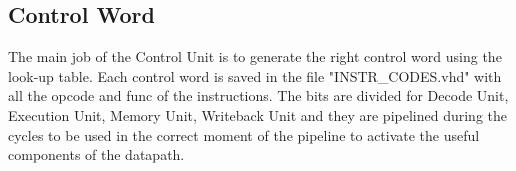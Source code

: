 \subsection{Control Word}
The main job of the Control Unit is to generate the right control word using the look-up table. Each control word is saved in the file "INSTR\_CODES.vhd" with all the opcode and func of the instructions.
The bits are divided for Decode Unit, Execution Unit, Memory Unit, Writeback Unit and they are pipelined during the cycles to be used in the correct moment of the pipeline to activate the useful components of the datapath.

